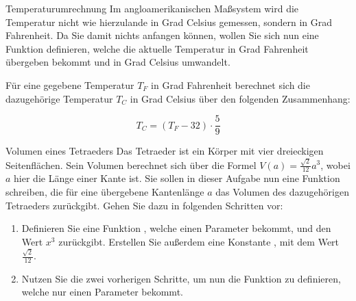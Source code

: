 \documentclass{../tuda-exercise}
\begin{document}
  \begin{task}[credit=\stars{0}{3}]{Temperaturumrechnung}
    Im angloamerikanischen Maßsystem wird die Temperatur nicht wie hierzulande in Grad Celsius
    gemessen, sondern in Grad Fahrenheit. Da Sie damit nichts anfangen können, wollen Sie sich
    nun eine Funktion  definieren, welche die aktuelle Temperatur in Grad
    Fahrenheit übergeben bekommt und in Grad Celsius umwandelt.

    \br

    \begin{note}[title=Hinweis:, color=tuda-orange]
      Für eine gegebene Temperatur \(T_F\) in Grad Fahrenheit berechnet sich die dazugehörige
      Temperatur \(T_C\) in Grad Celsius über den folgenden Zusammenhang:

      \begin{equation*}
        T_C = (T_F - 32) \cdot \frac{5}{9}
      \end{equation*}
    \end{note}

    \begin{solution}
      
    \end{solution}
  \end{task}

  \clearpagesolution

  \begin{task}[credit=\stars{1}{3}]{Volumen eines Tetraeders}
    Das Tetraeder ist ein Körper mit vier dreieckigen Seitenflächen. Sein Volumen berechnet sich
    über die Formel \(V(a) = \frac{\sqrt{2}}{12} a^3\), wobei \(a\) hier die Länge einer Kante
    ist. Sie sollen in dieser Aufgabe nun eine Funktion 
    schreiben, die für eine übergebene Kantenlänge \(a\) das Volumen des dazugehörigen Tetraeders
    zurückgibt. Gehen Sie dazu in folgenden Schritten vor:

    \begin{enumerate}
      \item Definieren Sie eine Funktion , welche einen Parameter
       bekommt, und den Wert \(x^3\) zurückgibt. Erstellen Sie außerdem eine
      Konstante , mit dem Wert \(\frac{\sqrt{2}}{12}\).
      \item Nutzen Sie die zwei vorherigen Schritte, um nun die Funktion
       zu definieren, welche nur einen Parameter
       bekommt.
    \end{enumerate}

    \begin{solution}
      
    \end{solution}
  \end{task}
\end{document}
